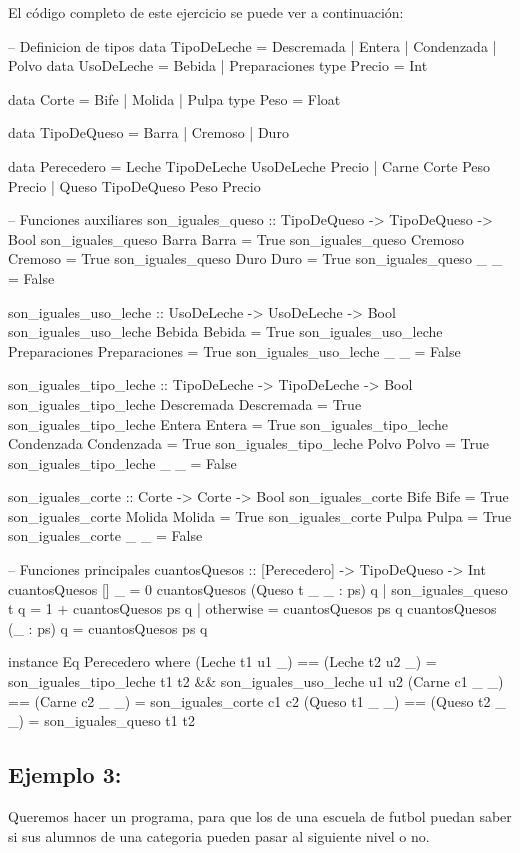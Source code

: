 \documentclass{article}
\begin{document}
\newpage
El código completo de este ejercicio se puede ver a continuación:
\begin{haskell}
-- Definicion de tipos
data TipoDeLeche = Descremada | Entera | Condenzada | Polvo
data UsoDeLeche = Bebida | Preparaciones
type Precio = Int

data Corte = Bife | Molida | Pulpa
type Peso = Float

data TipoDeQueso = Barra | Cremoso | Duro

data Perecedero = Leche TipoDeLeche UsoDeLeche Precio | Carne Corte Peso Precio | Queso TipoDeQueso Peso Precio

-- Funciones auxiliares
son_iguales_queso :: TipoDeQueso -> TipoDeQueso -> Bool
son_iguales_queso Barra Barra = True
son_iguales_queso Cremoso Cremoso = True
son_iguales_queso Duro Duro = True
son_iguales_queso _ _ = False

son_iguales_uso_leche :: UsoDeLeche -> UsoDeLeche -> Bool
son_iguales_uso_leche Bebida Bebida = True
son_iguales_uso_leche Preparaciones Preparaciones = True
son_iguales_uso_leche _ _ = False

son_iguales_tipo_leche :: TipoDeLeche -> TipoDeLeche -> Bool
son_iguales_tipo_leche Descremada Descremada = True
son_iguales_tipo_leche Entera Entera = True
son_iguales_tipo_leche Condenzada Condenzada = True
son_iguales_tipo_leche Polvo Polvo = True
son_iguales_tipo_leche _ _ = False

son_iguales_corte :: Corte -> Corte -> Bool
son_iguales_corte Bife Bife = True
son_iguales_corte Molida Molida = True
son_iguales_corte Pulpa Pulpa = True
son_iguales_corte _ _ = False

-- Funciones principales
cuantosQuesos :: [Perecedero] -> TipoDeQueso -> Int
cuantosQuesos [] _ = 0
cuantosQuesos (Queso t _ _ : ps) q
    | son_iguales_queso t q = 1 + cuantosQuesos ps q
    | otherwise = cuantosQuesos ps q
cuantosQuesos (_ : ps) q = cuantosQuesos ps q

instance Eq Perecedero where
    (Leche t1 u1 _) == (Leche t2 u2 _) = son_iguales_tipo_leche t1 t2 && son_iguales_uso_leche u1 u2
    (Carne c1 _ _) == (Carne c2 _ _) = son_iguales_corte c1 c2
    (Queso t1 _ _) == (Queso t2 _ _) = son_iguales_queso t1 t2
\end{haskell}

\newpage
\subsection{Ejemplo 3:}
Queremos hacer un programa, para que los de una escuela de futbol puedan saber si sus alumnos de una categoria pueden pasar al siguiente nivel o no.
\end{document}
